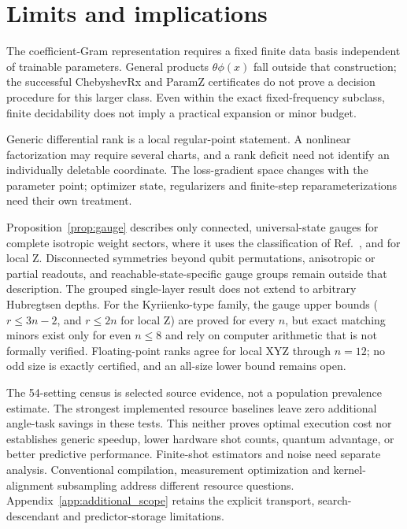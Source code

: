 \documentclass[a4paper,twocolumn,11pt,unpublished]{quantumarticle}
\begin{document}
\section{Limits and implications}
The coefficient-Gram representation requires a fixed finite data basis
independent of trainable parameters. General products $\theta\phi(x)$
fall outside that construction; the successful ChebyshevRx and ParamZ
certificates do not prove a decision procedure for this larger class.
Even within the exact fixed-frequency subclass, finite decidability
does not imply a practical expansion or minor budget.

Generic differential rank is a local regular-point statement. A
nonlinear factorization may require several charts, and a rank deficit
need not identify an individually deletable coordinate. The loss-gradient
space changes with the parameter point; optimizer state, regularizers
and finite-step reparameterizations need their own treatment.

Proposition~\ref{prop:gauge} describes only connected, universal-state
gauges for complete isotropic weight sectors, where it uses the
classification of Ref.~\cite{cpr2019locality}, and for local Z.
Disconnected symmetries beyond qubit permutations, anisotropic or
partial readouts, and reachable-state-specific gauge groups remain
outside that description. The grouped
single-layer result does not extend to arbitrary Hubregtsen depths.
For the Kyriienko-type family, the gauge upper bounds ($r\le3n-2$, and
$r\le2n$ for local Z) are proved for every $n$, but exact matching
minors exist only for even $n\le8$ and rely on computer arithmetic
that is not formally verified. Floating-point ranks agree for local
XYZ through $n=12$; no odd size is exactly certified, and an all-size
lower bound remains open.

The 54-setting census is selected source evidence, not a population
prevalence estimate. The strongest implemented resource baselines leave
zero additional angle-task savings in these tests. This neither proves
optimal execution cost nor establishes generic speedup, lower hardware
shot counts, quantum advantage, or better predictive performance.
Finite-shot estimators and noise need separate analysis. Conventional
compilation, measurement optimization and kernel-alignment subsampling
\cite{sahin2024subsampling} address different resource questions.
Appendix~\ref{app:additional_scope} retains the explicit transport,
search-descendant and predictor-storage limitations.
\end{document}
